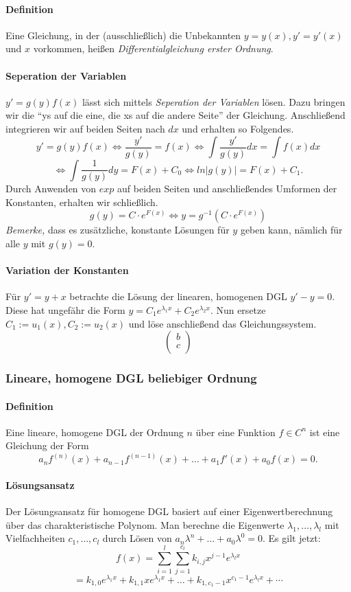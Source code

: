 \documentclass[a4paper, 9pt, DIV=24]{scrartcl}
\begin{document}
\paragraph{Definition}
Eine Gleichung, in der (ausschließlich) die Unbekannten $y = y(x), y' = y'(x)$ und $x$ vorkommen, heißen \emph{Differentialgleichung erster Ordnung}.
\paragraph{Seperation der Variablen}
$y' = g(y)f(x)$ lässt sich mittels \emph{Seperation der Variablen} lösen.
Dazu bringen wir die ``ys auf die eine, die xs auf die andere Seite'' der Gleichung.
Anschließend integrieren wir auf beiden Seiten nach $dx$ und erhalten so Folgendes.
\[ y' = g(y)f(x) \iff \frac{y'}{g(y)} = f(x) \iff \int\frac{y'}{g(y)}dx = \int f(x)dx \]
\[ \iff \int\frac{1}{g(y)}dy = F(x) + C_0 \iff ln |g(y)| = F(x) + C_1. \]
Durch Anwenden von $exp$ auf beiden Seiten und anschließendes Umformen der Konstanten, erhalten wir schließlich.
\[ g(y) = C\cdot e^{F(x)} \iff y = g^{-1}(C\cdot e^{F(x)}) \]
\emph{Bemerke,} dass es zusätzliche, konstante Lösungen für $y$ geben kann, nämlich für alle $y$ mit $g(y) = 0$.

\paragraph{Variation der Konstanten}
Für $y' = y + x$ betrachte die Lösung der linearen, homogenen DGL $y' - y = 0$. Diese hat ungefähr die Form $y = C_1 e^{\lambda_1 x} + C_2 e^{\lambda_2 x}$.
Nun ersetze $C_1 := u_1(x), C_2 := u_2(x)$ und löse anschließend das Gleichungssystem.
\[
\begin{pmatrix}
 b \\ c \\
\end{pmatrix}
\]

\subsubsection{Lineare, homogene DGL beliebiger Ordnung}
\paragraph{Definition} Eine lineare, homogene DGL der Ordnung $n$ über eine Funktion $f \in C^{n}$ ist eine Gleichung der Form
\[ a_n f^{(n)}(x) + a_{n-1} f^{(n-1)}(x) + \dots + a_1 f'(x) + a_0 f(x) = 0. \]
\paragraph{Lösungsansatz}
Der Lösungsansatz für homogene DGL basiert auf einer Eigenwertberechnung über das charakteristische Polynom.
Man berechne die Eigenwerte $\lambda_1, \dots, \lambda_l$ mit Vielfachheiten $c_1, \dots, c_l$ durch Lösen von $a_n\lambda^n + \dots + a_0\lambda^0 = 0$.
Es gilt jetzt:
\[ f(x) = \sum_{i=1}^{l}\sum_{j=1}^{c_l}k_{i,j}x^{j-1}e^{\lambda_l x} \]
\[ = k_{1,0}e^{\lambda_1 x} + k_{1,1}xe^{\lambda_1 x} + \dots + k_{1,c_1-1}x^{c_1-1}e^{\lambda_l x} + \cdots \]
\end{document}
